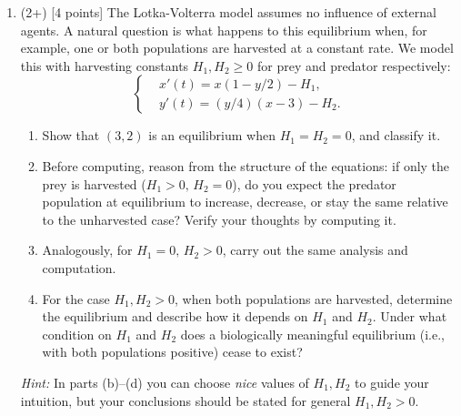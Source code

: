 \documentclass[12pt]{article}
\begin{document}
\begin{enumerate}
   \item (2+) [4 points] The Lotka-Volterra model assumes no influence of external agents. A natural question is what happens to this equilibrium when, for example, one or both populations are harvested at a constant rate. We model this with harvesting constants \(H_1, H_2 \geq 0\) for prey and predator respectively:
         \[
            \left\lbrace
            \begin{aligned}
                & x'(t)=x(1-y/2)-H_1,   \\
                & y'(t)=(y/4)(x-3)-H_2.
            \end{aligned}
            \right.
         \]
         \begin{enumerate}
            \item Show that \((3,2)\) is an equilibrium when \(H_1=H_2=0\), and classify it.
            \item Before computing, reason from the structure of the equations: if only the prey is harvested (\(H_1>0,\, H_2=0\)), do you expect the predator population at equilibrium to increase, decrease, or stay the same relative to the unharvested case? Verify your thoughts by computing it.
            \item Analogously, for \(H_1=0,\, H_2>0\), carry out the same analysis and computation.
            \item For the case \(H_1, H_2>0\), when both populations are harvested, determine the equilibrium and describe how it depends on \(H_1\) and \(H_2\). Under what condition on \(H_1\) and \(H_2\) does a biologically meaningful equilibrium (i.e., with both populations positive) cease to exist?
         \end{enumerate}
         \noindent\textit{Hint:} In parts (b)--(d) you can choose \emph{nice} values of \(H_1, H_2\) to guide your intuition, but your conclusions should be stated for general \(H_1, H_2>0\).


\end{enumerate}
\end{document}
